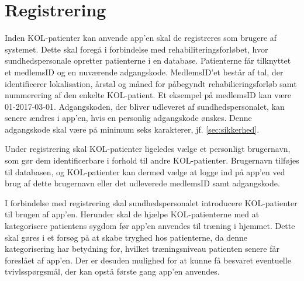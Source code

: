 \section{Registrering} \label{sec:registrering}
Inden KOL-patienter kan anvende app'en skal de registreres som brugere af systemet. Dette skal foregå i forbindelse med rehabiliteringsforløbet, hvor sundhedspersonale opretter patienterne i en database. Patienterne får tilknyttet et medlemsID og en nuværende adgangskode. MedlemsID'et består af tal, der identificerer lokalisation, årstal og måned for påbegyndt rehabilieringsforløb samt nummerering af den enkelte KOL-patient. Et eksempel på medlemsID kan være 01-2017-03-01.
Adgangskoden, der bliver udleveret af sundhedspersonalet, kan senere ændres i app'en, hvis en personlig adgangskode ønskes. Denne adgangskode skal være på minimum seks karakterer, jf. \autoref{sec:sikkerhed}.

Under registrering skal KOL-patienter ligeledes vælge et personligt brugernavn, som gør dem identificerbare i forhold til andre KOL-patienter. Brugernavn tilføjes til databasen, og KOL-patienter kan dermed vælge at logge ind på app'en ved brug af dette brugernavn eller det udleverede medlemsID samt adgangskode. 

I forbindelse med registrering skal sundhedspersonalet introducere KOL-patienter til brugen af app'en. Herunder skal de hjælpe KOL-patienterne med at kategorisere patientens sygdom før app'en anvendes til træning i hjemmet. Dette skal gøres i et forsøg på at skabe tryghed hos patienterne, da denne kategorisering har betydning for, hvilket træningsniveau patienten senere får foreslået af app'en. Der er desuden mulighed for at kunne få besvaret eventuelle tvivlsspørgsmål, der kan opstå første gang app'en anvendes. 
